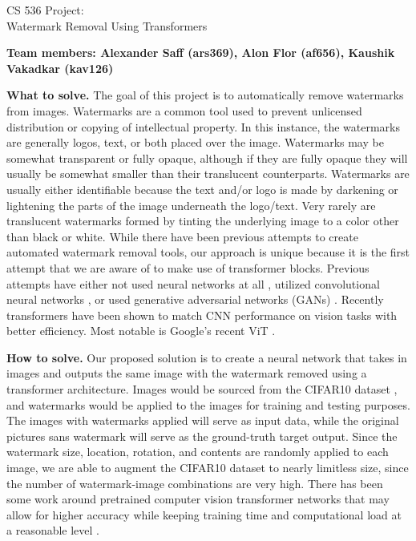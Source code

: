 \documentclass[11pt]{article}
\begin{document}
\begin{center}
\large{CS 536 Project:\\Watermark Removal Using Transformers}\\
\end{center}
\vspace{5mm}

\textbf{Team members: Alexander Saff (ars369), Alon Flor (af656), Kaushik Vakadkar (kav126)}




\begin{sloppypar}
\textbf{What to solve.}
The goal of this project is to automatically remove watermarks from images. Watermarks are a common tool used to prevent unlicensed distribution or copying of intellectual property. In this instance, the watermarks are generally logos, text, or both placed over the image. Watermarks may be somewhat transparent or fully opaque, although if they are fully opaque they will usually be somewhat smaller than their translucent counterparts. Watermarks are usually either identifiable because the text and/or logo is made by darkening or lightening the parts of the image underneath the logo/text. Very rarely are translucent watermarks formed by tinting the underlying image to a color other than black or white. While there have been previous attempts to create automated watermark removal tools, our approach is unique because it is the first attempt that we are aware of to make use of transformer blocks. Previous attempts have either not used neural networks at all \cite{48101}, utilized convolutional neural networks \cite{8579082}, or used generative adversarial networks (GANs) \cite{rickwierenga}. Recently transformers have been shown to match CNN performance on vision tasks with better efficiency. Most notable is Google’s recent ViT \cite{dosovitskiy2020image}.
\end{sloppypar}

\begin{sloppypar}
\textbf{How to solve.} 
Our proposed solution is to create a neural network that takes in images and outputs the same image with the watermark removed using a transformer architecture. Images would be sourced from the CIFAR10 dataset \cite{Krizhevsky2009LearningML}, and watermarks would be applied to the images for training and testing purposes. The images with watermarks applied will serve as input data, while the original pictures sans watermark will serve as the ground-truth target output. Since the watermark size, location, rotation, and contents are randomly applied to each image, we are able to augment the CIFAR10 dataset to nearly limitless size, since the number of watermark-image combinations are very high. There has been some work around pretrained computer vision transformer networks that may allow for higher accuracy while keeping training time and computational load at a reasonable level \cite{chen2020pretrained}.
\end{sloppypar}
\end{document}
